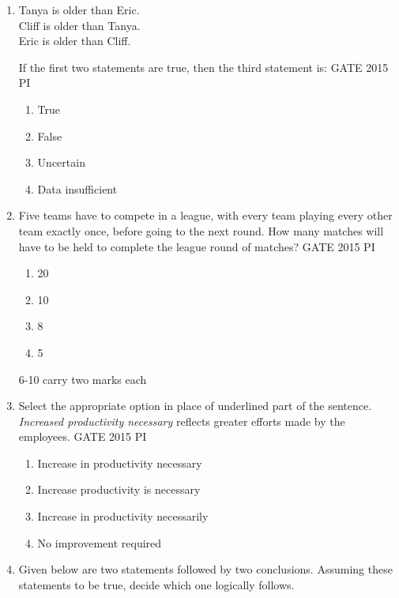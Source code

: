 \documentclass[journal,12pt,onecolumn]{IEEEtran}
\theoremstyle{remark}
\begin{document}
\begin{enumerate}
\item Tanya is older than Eric.\\
Cliff is older than Tanya.\\
Eric is older than Cliff.

If the first two statements are true, then the third statement is:
\hfill{GATE 2015 PI}

\begin{multicols}{2}
\begin{enumerate}
    \item True
    \item False
    \item Uncertain
    \item Data insufficient
\end{enumerate}
\end{multicols}
\item Five teams have to compete in a league, with every team playing every other team exactly once, before going to the next round. How many matches will have to be held to complete the league round of matches?
\hfill{GATE 2015 PI}

\begin{multicols}{2}
\begin{enumerate}
    \item 20
    \item 10
    \item 8
    \item 5
\end{enumerate}
\end{multicols}
6-10 carry two marks each
\item Select the appropriate option in place of underlined part of the sentence.\\
\textit{Increased productivity necessary} reflects greater efforts made by the employees.
\hfill{GATE 2015 PI}

\begin{multicols}{2}
\begin{enumerate}
    \item Increase in productivity necessary
    \item Increase productivity is necessary
    \item Increase in productivity necessarily
    \item No improvement required
\end{enumerate}
\end{multicols}
\item Given below are two statements followed by two conclusions. Assuming these statements to be true, decide which one logically follows.


\end{enumerate}
\end{document}
